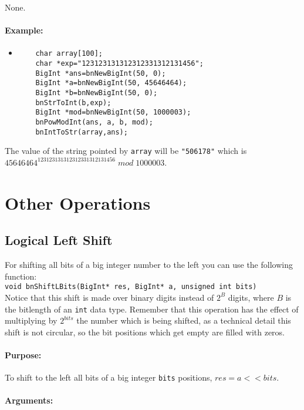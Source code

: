 \documentclass{book}
\begin{document}
None.

\paragraph{Example:}

\begin{itemize}
\item
\begin{verbatim}
    char array[100];
    char *exp="123123131312312331312131456";
    BigInt *ans=bnNewBigInt(50, 0);
    BigInt *a=bnNewBigInt(50, 45646464);
    BigInt *b=bnNewBigInt(50, 0);
    bnStrToInt(b,exp);
    BigInt *mod=bnNewBigInt(50, 1000003);
    bnPowModInt(ans, a, b, mod);
    bnIntToStr(array,ans);
\end{verbatim}
\end{itemize}

The value of the string pointed by \verb+array+ will be \verb+"506178"+  which is $45646464^{123123131312312331312131456}\;mod\;1000003$.

\section{Other Operations}

\subsection{Logical Left Shift}

For shifting all bits of a big integer number to the left you can use the following function:\\

\verb+void bnShiftLBits(BigInt* res, BigInt* a, unsigned int bits)+\\

Notice that this shift is made over binary digits instead of $2^B$ digits, where $B$ is the bitlength of an \verb+int+ data type. Remember that this operation has the effect of multiplying  by $2^{bits}$ the number which is being shifted, as a technical detail this shift is not circular, so the bit positions which get empty are filled with zeros.

\paragraph{Purpose:} 

To shift to the left all bits of a big integer \verb+bits+ positions, $res = a << bits$.

\paragraph{Arguments:}
\end{document}
